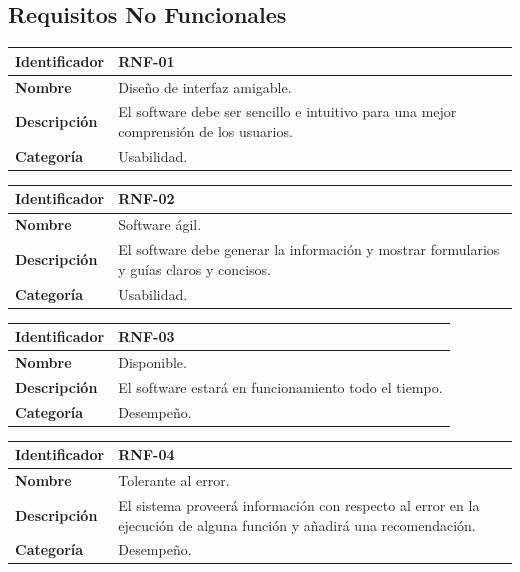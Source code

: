 \documentclass[12pt,a4paper]{article}
\begin{document}
\subsection{Requisitos No Funcionales}
\begin{center}
\begin{tabular}{|m{5.5cm}|m{9.5cm}|}
\hline
\textbf{Identificador} & RNF-01\\
\hline
\textbf{Nombre} & Diseño de interfaz amigable.\\
\hline
\textbf{Descripción} & El software debe ser sencillo e intuitivo para una mejor comprensión de los usuarios.\\
\hline
\textbf{Categoría} & Usabilidad.\\
\hline
\end{tabular}
\vspace{5mm}

\begin{tabular}{|m{5.5cm}|m{9.5cm}|}
\hline
\textbf{Identificador} & RNF-02\\
\hline
\textbf{Nombre} & Software ágil.\\
\hline
\textbf{Descripción} & El software debe generar la información y mostrar formularios y guías claros y concisos.\\
\hline
\textbf{Categoría} & Usabilidad.\\
\hline
\end{tabular}
\vspace{5mm}

\begin{tabular}{|m{5.5cm}|m{9.5cm}|}
\hline
\textbf{Identificador} & RNF-03\\
\hline
\textbf{Nombre} & Disponible.\\
\hline
\textbf{Descripción} & El software estará en funcionamiento todo el tiempo.\\
\hline
\textbf{Categoría} & Desempeño.\\
\hline
\end{tabular}
\vspace{5mm}

\begin{tabular}{|m{5.5cm}|m{9.5cm}|}
\hline
\textbf{Identificador} & RNF-04\\
\hline
\textbf{Nombre} & Tolerante al error.\\
\hline
\textbf{Descripción} & El sistema proveerá información con respecto al error en la ejecución de alguna función y añadirá una recomendación.\\
\hline
\textbf{Categoría} & Desempeño.\\
\hline
\end{tabular}
\vspace{5mm}


\end{center}
\end{document}

